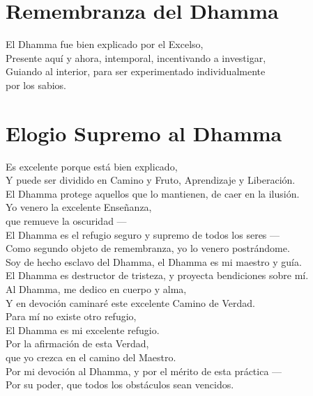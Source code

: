 \clearpage

\chapter{Remembranza del Dhamma}

\begin{leader}
\end{leader}


El Dhamma fue bien explicado por el Excelso,\\
Presente aquí y ahora, intemporal, incentivando a investigar,\\
Guiando al interior, para ser experimentado individualmente\\
\vin por los sabios.


\nextChapterUseDelegatedPageNumber

\chapter{Elogio Supremo al Dhamma}

\begin{leader}
\end{leader}

\enlargethispage{\baselineskip}

Es excelente porque está bien explicado,\\
Y puede ser dividido en Camino y Fruto, Aprendizaje y Liberación.\\
El Dhamma protege aquellos que lo mantienen, de caer en la ilusión.\\
Yo venero la excelente Enseñanza,\\
\vin que remueve la oscuridad ---\\
El Dhamma es el refugio seguro y supremo de todos los seres ---\\
Como segundo objeto de remembranza, yo lo venero postrándome.\\
Soy de hecho esclavo del Dhamma, el Dhamma es mi maestro y guía.\\
El Dhamma es destructor de tristeza, y proyecta bendiciones sobre mí.\\
Al Dhamma, me dedico en cuerpo y alma,\\
Y en devoción caminaré este excelente Camino de Verdad.\\
Para mí no existe otro refugio,\\
\vin El Dhamma es mi excelente refugio.\\
Por la afirmación de esta Verdad,\\
\vin que yo crezca en el camino del Maestro.\\
Por mi devoción al Dhamma, y por el mérito de esta práctica ---\\
Por su poder, que todos los obstáculos sean vencidos.

